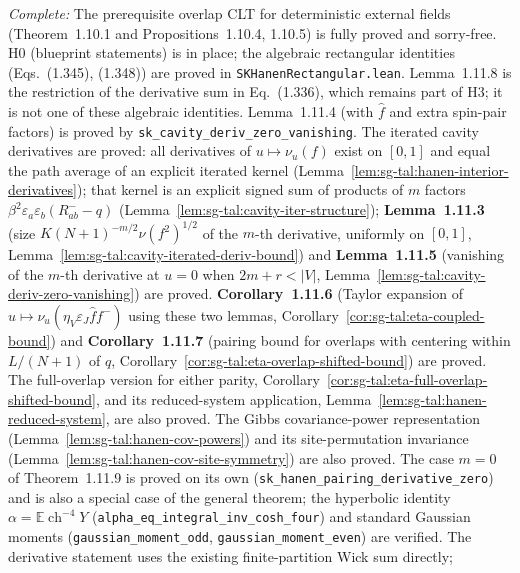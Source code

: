 \begin{remark}\label{rem:sg-tal:hanen-status}
\emph{Complete:} The prerequisite overlap CLT for deterministic external fields
(Theorem~1.10.1 and Propositions~1.10.4, 1.10.5) is fully proved and sorry-free.
H0 (blueprint statements) is in place; the algebraic rectangular identities
(Eqs.~(1.345), (1.348)) are proved in \texttt{SKHanenRectangular.lean}.
Lemma~1.11.8 is the restriction of the derivative sum in Eq.~(1.336),
which remains part of H3; it is not one of these algebraic identities.
Lemma~1.11.4 (with $\hat f$ and extra spin-pair factors) is proved by
\texttt{sk\_cavity\_deriv\_zero\_vanishing}. The iterated cavity derivatives are proved:
all derivatives of $u\mapsto\nu_u(f)$ exist on $[0,1]$ and equal the path average of an explicit
iterated kernel (Lemma~\ref{lem:sg-tal:hanen-interior-derivatives}); that kernel is an explicit
signed sum of products of $m$ factors $\beta^2\varepsilon_a\varepsilon_b(R^-_{ab}-q)$
(Lemma~\ref{lem:sg-tal:cavity-iter-structure}); \textbf{Lemma~1.11.3} (size
$K(N+1)^{-m/2}\nu(f^2)^{1/2}$ of the $m$-th derivative, uniformly on $[0,1]$,
Lemma~\ref{lem:sg-tal:cavity-iterated-deriv-bound}) and \textbf{Lemma~1.11.5} (vanishing of the
$m$-th derivative at $u=0$ when $2m+r<|V|$, Lemma~\ref{lem:sg-tal:cavity-deriv-zero-vanishing})
are proved. \textbf{Corollary~1.11.6}
(Taylor expansion of $u\mapsto\nu_u(\eta_V\varepsilon_J\hat f f^-)$
using these two lemmas, Corollary~\ref{cor:sg-tal:eta-coupled-bound}) and \textbf{Corollary~1.11.7}
(pairing bound for overlaps with centering within $L/(N+1)$ of $q$,
Corollary~\ref{cor:sg-tal:eta-overlap-shifted-bound}) are proved. The full-overlap version
for either parity, Corollary~\ref{cor:sg-tal:eta-full-overlap-shifted-bound}, and its
reduced-system application, Lemma~\ref{lem:sg-tal:hanen-reduced-system}, are also proved. The Gibbs covariance-power
representation (Lemma~\ref{lem:sg-tal:hanen-cov-powers}) and its site-permutation
invariance (Lemma~\ref{lem:sg-tal:hanen-cov-site-symmetry}) are also proved.
The case $m=0$ of Theorem~1.11.9 is proved on its own (\texttt{sk\_hanen\_pairing\_derivative\_zero}) and is also a special case of the general theorem;
the hyperbolic identity $\alpha = \mathbb E\operatorname{ch}^{-4} Y$
(\texttt{alpha\_eq\_integral\_inv\_cosh\_four}) and standard Gaussian moments
(\texttt{gaussian\_moment\_odd}, \texttt{gaussian\_moment\_even}) are verified.
The derivative statement uses the existing finite-partition Wick sum directly;

\end{remark}
